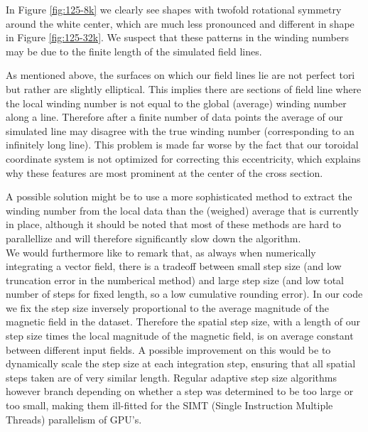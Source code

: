 \documentclass[a4paper]{article}
\begin{document}
In Figure \ref{fig:125-8k} we clearly see shapes with twofold rotational symmetry around the white center, which are much less pronounced and different in shape in Figure \ref{fig:125-32k}.
We suspect that these patterns in the winding numbers may be due to the finite length of the simulated field lines. 

As mentioned above, the surfaces on which our field lines lie are not perfect tori but rather are slightly elliptical. This implies there are sections of field line where the local winding number is not equal to the global (average) winding number along a line. 
Therefore after a finite number of data points the average of our simulated line may disagree with the true winding number (corresponding to an infinitely long line). 
This problem is made far worse by the fact that our toroidal coordinate system is not optimized for correcting this eccentricity, which explains why these features are most prominent at the center of the cross section. 

A possible solution might be to use a more sophisticated method to extract the winding number from the local data than the (weighed) average that is currently in place, although it should be noted that most of these methods are hard to parallellize and will therefore significantly slow down the algorithm.\\

We would furthermore like to remark that, as always when numerically integrating a vector field, there is a tradeoff between small step size (and low truncation error in the numberical method) and large step size (and low total number of steps for fixed length, so a low cumulative rounding error). 
In our code we fix the step size inversely proportional to the average magnitude of the magnetic field in the dataset. 
Therefore the spatial step size, with a length of our step size times the local magnitude of the magnetic field, is on average constant between different input fields. 
A possible improvement on this would be to dynamically scale the step size at each integration step, ensuring that all spatial steps taken are of very similar length. Regular adaptive step size algorithms however branch depending on whether a step was determined to be too large or too small, making them ill-fitted for the SIMT (Single Instruction Multiple Threads) parallelism of GPU's.\\
\end{document}

